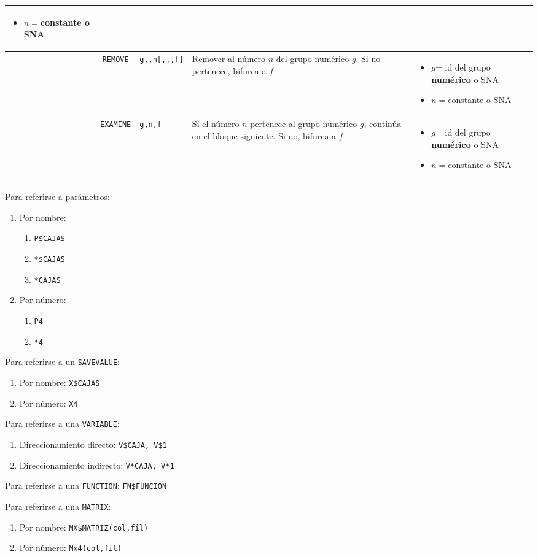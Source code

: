 \documentclass{article}
\providecommand{\tabularnewline}{\\}
\begin{document}
\begin{longtable}{|lc>{\raggedright}p{}|>{\raggedright}p{}|>{\raggedright}p{}|>{\raggedright}p{}|}
\begin{itemize}
\item $n=$constante o SNA\end{itemize}
 & \tabularnewline
\hline 
 & \texttt{REMOVE} & \texttt{g,,n{[},,,f{]}} & Remover al número $n$ del grupo numérico $g$. Si no pertenece, bifurca
a $f$ & \begin{itemize}
\item $g$= id del grupo \textbf{numérico} o SNA
\item $n=$constante o SNA\end{itemize}
 & \tabularnewline
\hline 
 & \texttt{EXAMINE} & \texttt{g,n,f} & Si el número $n$ pertenece al grupo numérico $g$, continúa en el
bloque siguiente. Si no, bifurca a $f$ & \begin{itemize}
\item $g$= id del grupo \textbf{numérico} o SNA
\item $n=$constante o SNA\end{itemize}
 & \tabularnewline
\hline 
\end{longtable}

\pagebreak{}Para referirse a parámetros:
\begin{enumerate}
\item Por nombre: 

\begin{enumerate}
\item \texttt{P\$CAJAS}
\item \texttt{{*}\$CAJAS}
\item \texttt{{*}CAJAS}
\end{enumerate}
\item Por número:

\begin{enumerate}
\item \texttt{P4}
\item \texttt{{*}4}
\end{enumerate}
\end{enumerate}
Para referirse a un \texttt{SAVEVALUE}:
\begin{enumerate}
\item Por nombre: \texttt{X\$CAJAS}
\item Por número: \texttt{X4}
\end{enumerate}
Para referirse a una \texttt{VARIABLE}: 
\begin{enumerate}
\item Direccionamiento directo: \texttt{V\$CAJA, V\$1}
\item Direccionamiento indirecto: \texttt{V{*}CAJA, V{*}1}
\end{enumerate}
Para referirse a una \texttt{FUNCTION}: \texttt{FN\$FUNCION}

Para referirse a una \texttt{MATRIX}:
\begin{enumerate}
\item Por nombre: \texttt{MX\$MATRIZ(col,fil)}
\item Por número: \texttt{Mx4(col,fil)}\end{enumerate}
\end{document}
